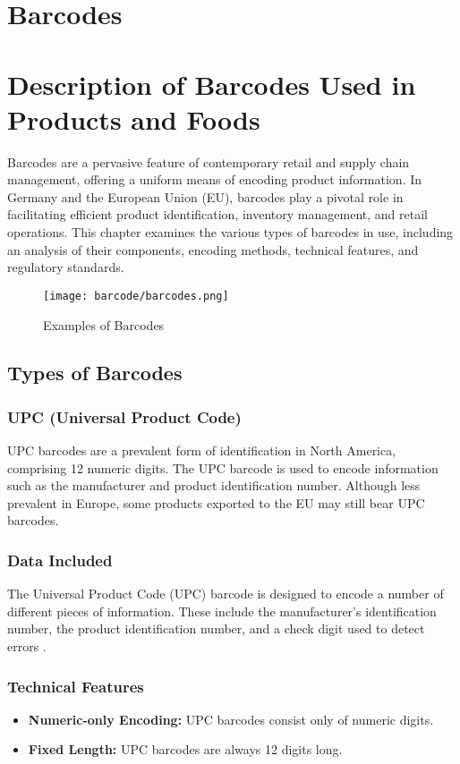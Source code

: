 \section{Barcodes}

\section{Description of Barcodes Used in Products and Foods}

Barcodes are a pervasive feature of contemporary retail and supply chain management, offering a uniform means of encoding product information. In Germany and the European Union (EU), barcodes play a pivotal role in facilitating efficient product identification, inventory management, and retail operations. This chapter examines the various types of barcodes in use, including an analysis of their components, encoding methods, technical features, and regulatory standards.

\begin{figure}[h]
	\centering
	\texttt{[image: barcode/barcodes.png]}
	\caption{Examples of Barcodes}
	\label{fig:barcodes}
\end{figure}

\subsection{Types of Barcodes}

\subsubsection{UPC (Universal Product Code)}
UPC barcodes are a prevalent form of identification in North America, comprising 12 numeric digits. The UPC barcode is used to encode information such as the manufacturer and product identification number. Although less prevalent in Europe, some products exported to the EU may still bear UPC barcodes.

\subsubsection{Data Included}
The Universal Product Code (UPC) barcode is designed to encode a number of different pieces of information. These include the manufacturer's identification number, the product identification number, and a check digit used to detect errors \cite{eu_reg_1169_2011}.

\subsubsection{Technical Features}
\begin{itemize}
	\item \textbf{Numeric-only Encoding:} UPC barcodes consist only of numeric digits.
	\item \textbf{Fixed Length:} UPC barcodes are always 12 digits long.
\end{itemize}

